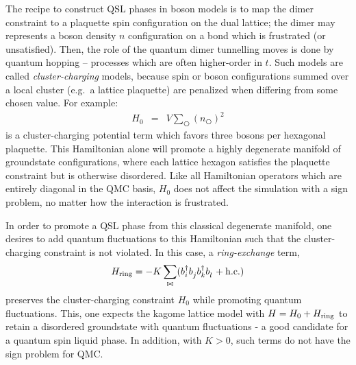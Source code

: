 \documentclass[aps,prb,groupedaddress,twocolumn]{revtex4}
\begin{document}
The recipe to construct QSL phases in boson models is to map the dimer constraint to a plaquette spin configuration on the dual lattice; the dimer may represents a boson density $n$ configuration on a bond which is frustrated (or unsatisfied).  Then, the role of the quantum dimer tunnelling moves is done by quantum hopping -- processes which are often higher-order in $t$.  Such models are called
{\it cluster-charging} models,\cite{Isakov2} because spin or boson configurations summed over a local cluster (e.g.~a lattice plaquette) are penalized when differing from some chosen value.  For example:
\begin{eqnarray}
H_0 &=& V \sum_{\hexagon} (n_{\hexagon})^2 
\end{eqnarray}
is a cluster-charging potential term which favors three bosons per hexagonal plaquette.  This Hamiltonian alone will promote a highly degenerate manifold of groundstate configurations, where each lattice hexagon satisfies the plaquette constraint but is otherwise disordered.  
Like all Hamiltonian operators which are entirely diagonal in the QMC basis, $H_0$ does not affect the simulation with a sign problem, no matter how the interaction is frustrated.

In order to promote a QSL phase from this classical degenerate manifold, one desires to add quantum fluctuations to this Hamiltonian such that the cluster-charging constraint is not violated.  In this case, a {\it ring-exchange} term, 
\begin{eqnarray}
H_{\rm ring} = -K \sum_{\bowtie} ( b_i^{\dagger} b_j^{\phantom\dagger} b_k^{\dagger} b_l^{\phantom\dagger} + {\rm h.c.} )
\end{eqnarray} 
preserves the cluster-charging constraint $H_0$ while promoting quantum fluctuations.  This, one expects the kagome lattice model with $H = H_0 + H_{\rm ring}$ to retain a disordered groundstate with quantum fluctuations - a good candidate for a quantum spin liquid phase.  In addition, with $K>0$, such terms do not have the sign problem for QMC.
\end{document}
